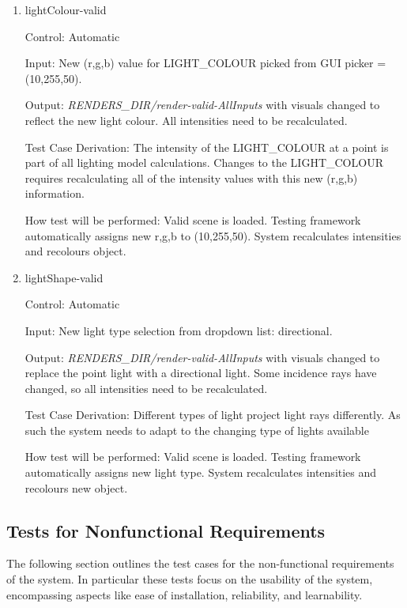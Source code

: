 \documentclass[12pt, titlepage]{article}
\begin{document}
\begin{enumerate}
	\item{lightColour-valid\\}
	
	Control: Automatic
	
	Input: New (r,g,b) value for LIGHT\_COLOUR picked from GUI picker = 
	(10,255,50).
	
	Output: \textit{RENDERS\_DIR/render-valid-AllInputs} with visuals changed 
	to reflect the new light colour. All intensities need to be 
	recalculated.
	
	Test Case Derivation: The intensity of the LIGHT\_COLOUR at a point is part 
	of all lighting model calculations. Changes to the LIGHT\_COLOUR requires 
	recalculating all of the intensity values with this new (r,g,b) information.
	
	How test will be performed: Valid scene is loaded. Testing framework 
	automatically assigns new r,g,b to (10,255,50). System recalculates 
	intensities and recolours object.		


	\item{lightShape-valid\\}
	
	Control: Automatic
	
	Input: New light type selection from dropdown list: directional.
	
	Output: \textit{RENDERS\_DIR/render-valid-AllInputs} with visuals changed 
	to replace the point light with a directional light. Some incidence rays 
	have changed, so all intensities need to be recalculated.
	
	Test Case Derivation: Different types of light project light rays 
	differently. As such the system needs to adapt to the changing type of 
	lights available
	
	How test will be performed: Valid scene is loaded. Testing framework 
	automatically assigns new light type. System recalculates 
	intensities and recolours new object.
	
\end{enumerate}

\subsection{Tests for Nonfunctional Requirements}
The following section outlines the test cases for the non-functional 
requirements of the system. In particular these tests focus on the usability of 
the system, encompassing aspects like ease of installation, reliability, and 
learnability.
%
%
\end{document}
